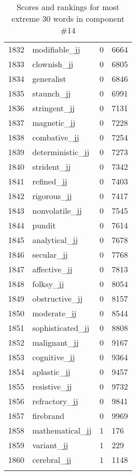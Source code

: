 \begin{longtable}[!htbp]{| rlr@{.}l |}
    1832 & modifiable\_jj & 0 & 6664 \\
    1833 & clownish\_jj & 0 & 6805 \\
    1834 & generalist & 0 & 6846 \\
    1835 & staunch\_jj & 0 & 6991 \\
    1836 & stringent\_jj & 0 & 7131 \\
    1837 & magnetic\_jj & 0 & 7228 \\
    1838 & combative\_jj & 0 & 7254 \\
    1839 & deterministic\_jj & 0 & 7273 \\
    1840 & strident\_jj & 0 & 7342 \\
    1841 & refined\_jj & 0 & 7403 \\
    1842 & rigorous\_jj & 0 & 7417 \\
    1843 & nonvolatile\_jj & 0 & 7545 \\
    1844 & pundit & 0 & 7614 \\
    1845 & analytical\_jj & 0 & 7678 \\
    1846 & secular\_jj & 0 & 7768 \\
    1847 & affective\_jj & 0 & 7813 \\
    1848 & folksy\_jj & 0 & 8054 \\
    1849 & obstructive\_jj & 0 & 8157 \\
    1850 & moderate\_jj & 0 & 8544 \\
    1851 & sophisticated\_jj & 0 & 8808 \\
    1852 & malignant\_jj & 0 & 9167 \\
    1853 & cognitive\_jj & 0 & 9364 \\
    1854 & aplastic\_jj & 0 & 9457 \\
    1855 & resistive\_jj & 0 & 9732 \\
    1856 & refractory\_jj & 0 & 9841 \\
    1857 & firebrand & 0 & 9969 \\
    1858 & mathematical\_jj & 1 & 176 \\
    1859 & variant\_jj & 1 & 229 \\
    1860 & cerebral\_jj & 1 & 1148 \\
    \hline
    \caption{Scores and rankings for most extreme 30 words in component \#14} \\
\end{longtable}
